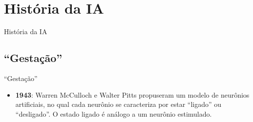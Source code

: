 \documentclass{libs/ufc_format}
\begin{document}
\section{História da IA}

\begin{frame}{}
    \centering
    \Large
    História da IA
\end{frame}

\subsection{``Gestação''}

\begin{frame}{``Gestação''}
    \begin{itemize}
        \justifying
        \item \textbf{1943}: Warren McCulloch e Walter Pitts propuseram um modelo de neurônios artificiais, no qual cada neurônio se caracteriza por estar ``ligado'' ou ``desligado''. O estado \alert{ligado} é análogo a um neurônio estimulado.\\
    \end{itemize}
\end{frame}
\end{document}
